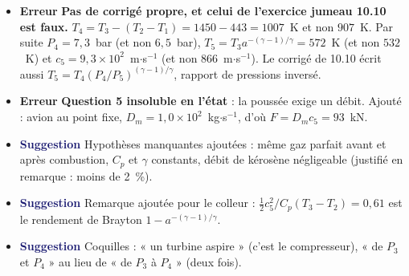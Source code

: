 \documentclass[a4paper,11pt]{article}
\newcommand{\erreur}{\textcolor{BrickRed}{\textbf{Erreur}}}
\newcommand{\suggestion}{\textcolor{MidnightBlue}{\textbf{Suggestion}}}
\begin{document}
\begin{itemize}
	\item \erreur{} \textbf{Pas de corrigé propre, et celui de l'exercice jumeau 10.10 est faux.}
	$T_4=T_3-(T_2-T_1)=1450-443=1007$~K et non $907$~K. Par suite $P_4=7{,}3$~bar (et non
	$6{,}5$~bar), $T_5=T_3a^{-(\gamma-1)/\gamma}=572$~K (et non $532$~K) et
	$c_5=9{,}3\times10^{2}$~m$\cdot$s$^{-1}$ (et non $866$~m$\cdot$s$^{-1}$). Le corrigé de 10.10
	écrit aussi $T_5=T_4\left(P_4/P_5\right)^{(\gamma-1)/\gamma}$, rapport de pressions inversé.
	\item \erreur{} \textbf{Question 5 insoluble en l'état} : la poussée exige un débit. Ajouté :
	avion au point fixe, $D_m=1{,}0\times10^{2}$~kg$\cdot$s$^{-1}$, d'où $F=D_mc_5=93$~kN.
	\item \suggestion{} Hypothèses manquantes ajoutées : même gaz parfait avant et après combustion,
	$C_p$ et $\gamma$ constants, débit de kérosène négligeable (justifié en remarque : moins de 2~\%).
	\item \suggestion{} Remarque ajoutée pour le colleur : $\frac{1}{2}c_5^2/C_p(T_3-T_2)=0{,}61$
	est le rendement de Brayton $1-a^{-(\gamma-1)/\gamma}$.
	\item \suggestion{} Coquilles : « un turbine aspire » (c'est le compresseur), « de $P_3$ et
	$P_4$ » au lieu de « de $P_3$ à $P_4$ » (deux fois).
\end{itemize}
\end{document}
